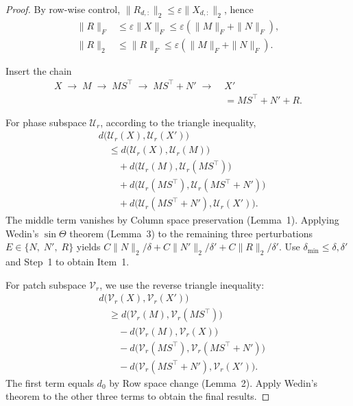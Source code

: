 \begin{proof}
By row-wise control,
$\|R_{d,:}\|_2\le \varepsilon\|X_{d,:}\|_2$, hence
\[
\begin{aligned}
\|R\|_F&\le \varepsilon\|X\|_F\le \varepsilon(\|M\|_F+\|N\|_F),\\
\|R\|_2&\le \|R\|_F\le \varepsilon(\|M\|_F+\|N\|_F).
\end{aligned}
\]

Insert the chain
\[
\begin{aligned}
X \;\to\; M \;\to\; MS^\top \;\to\; MS^\top+N' \;\to\;{}& X'\\
&=MS^\top+N'+R.
\end{aligned}
\]

For phase subspace $\mathcal U_r$, according to the triangle inequality,
\[
\begin{aligned}
&d\big(\mathcal U_r(X),\mathcal U_r(X')\big)\\
&\quad\le d\big(\mathcal U_r(X),\mathcal U_r(M)\big)\\
&\qquad + d\big(\mathcal U_r(M),\mathcal U_r(MS^\top)\big)\\
&\qquad + d\big(\mathcal U_r(MS^\top),\mathcal U_r(MS^\top+N')\big)\\
&\qquad + d\big(\mathcal U_r(MS^\top+N'),\mathcal U_r(X')\big).
\end{aligned}
\]
The middle term vanishes by Column space preservation (Lemma~1).
Applying Wedin’s $\sin\Theta$ theorem (Lemma~3) to the remaining three perturbations $E\in\{N,\;N',\;R\}$
yields
$C\|N\|_2/\delta + C\|N'\|_2/\delta' + C\|R\|_2/\delta'$.
Use $\delta_{\min}\le\delta,\delta'$ and Step~1 to obtain Item~1.

For patch subspace $\mathcal V_r$, we use the reverse triangle inequality:
\[
\begin{aligned}
&d\big(\mathcal V_r(X),\mathcal V_r(X')\big)\\
&\quad\ge d\big(\mathcal V_r(M),\mathcal V_r(MS^\top)\big)\\
&\qquad - d\big(\mathcal V_r(M),\mathcal V_r(X)\big)\\
&\qquad - d\big(\mathcal V_r(MS^\top),\mathcal V_r(MS^\top+N')\big)\\
&\qquad - d\big(\mathcal V_r(MS^\top+N'),\mathcal V_r(X')\big).
\end{aligned}
\]
The first term equals $d_0$ by Row space change (Lemma~2).
Apply Wedin’s theorem to the other three terms to obtain the final results.
\end{proof}


